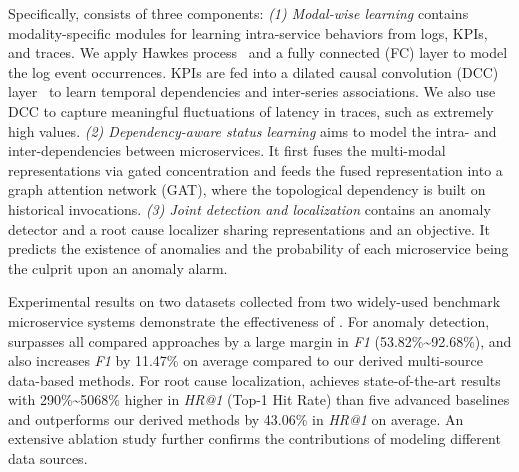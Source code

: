 Specifically, \name consists of three components:
\textit{(1) Modal-wise learning} contains modality-specific modules for learning intra-service behaviors from logs, KPIs, and traces. 
We apply Hawkes process~\cite{Hawkes} and a fully connected (FC) layer to model the log event occurrences.
KPIs are fed into a dilated causal convolution (DCC) layer~\cite{TCN} to learn temporal dependencies and inter-series associations.
We also use DCC to capture meaningful fluctuations of latency in traces, such as extremely high values.
\textit{(2) Dependency-aware status learning} aims to model the intra- and inter-dependencies between microservices.
It first fuses the multi-modal representations via gated concentration and feeds the fused representation into a graph attention network (GAT), where the topological dependency is built on historical invocations.
\textit{(3) Joint detection and localization} contains an anomaly detector and a root cause localizer sharing representations and an objective. It predicts the existence of anomalies and the probability of each microservice being the culprit upon an anomaly alarm.

Experimental results on two datasets collected from two widely-used benchmark microservice systems demonstrate the effectiveness of \name. 
For anomaly detection, \name surpasses all compared approaches by a large margin 
in \textit{F1} (53.82\%\textasciitilde92.68\%), and also increases \textit{F1} by 11.47\% on average compared to our derived multi-source data-based methods.
For root cause localization, \name achieves state-of-the-art results with 290\%\textasciitilde5068\% higher in \textit{HR@1} (Top-1 Hit Rate) than five advanced baselines and outperforms our derived methods by 43.06\% in \textit{HR@1} on average.
An extensive ablation study further confirms the contributions of modeling different data sources.

